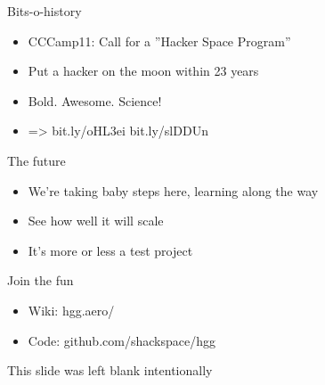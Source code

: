 
\newlength{\smallcol}
\setlength{\smallcol}{0.3\textwidth}

\newlength{\bigcol}
\setlength{\bigcol}{\textwidth}
\addtolength{\bigcol}{- \smallcol}


\begin{frame}[plain]
\end{frame}

	\begin{frame}{Bits-o-history}
		\begin{itemize}
			\item<1-> CCCamp11: Call for a ''Hacker Space Program''
			\item<2-> Put a hacker on the moon within 23 years
			\item<3-> Bold.  Awesome.  Science!
			\item<4-> => \hspace{0.5cm} bit.ly/oHL3ei \hspace{0.5cm} bit.ly/slDDUn
		\end{itemize}
	\end{frame}




	\begin{frame}{The future}
		\begin{itemize}
			\item<2-> We're taking baby steps here, learning along the way
			\item<3-> See how well it will scale
			\item<4-> It's more or less a test project
		\end{itemize}
	\end{frame}

	\begin{frame}{Join the fun}
		\begin{itemize}
			\item<1-> Wiki: hgg.aero/
			\item<1-> Code: github.com/shackspace/hgg
		\end{itemize}
	\end{frame}

	\begin{frame}{}
		This slide was left blank intentionally
	\end{frame}
